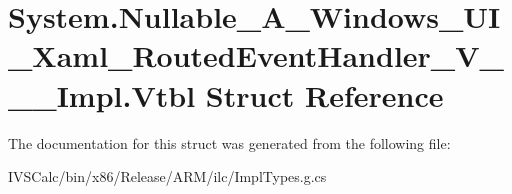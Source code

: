\hypertarget{struct_system_1_1_nullable___a___windows___u_i___xaml___routed_event_handler___v_______impl_1_1_vtbl}{}\section{System.\+Nullable\+\_\+\+A\+\_\+\+Windows\+\_\+\+U\+I\+\_\+\+Xaml\+\_\+\+Routed\+Event\+Handler\+\_\+\+V\+\_\+\+\_\+\+\_\+\+Impl.\+Vtbl Struct Reference}
\label{struct_system_1_1_nullable___a___windows___u_i___xaml___routed_event_handler___v_______impl_1_1_vtbl}


The documentation for this struct was generated from the following file\+:\begin{DoxyCompactItemize}
\item 
I\+V\+S\+Calc/bin/x86/\+Release/\+A\+R\+M/ilc/Impl\+Types.\+g.\+cs\end{DoxyCompactItemize}

